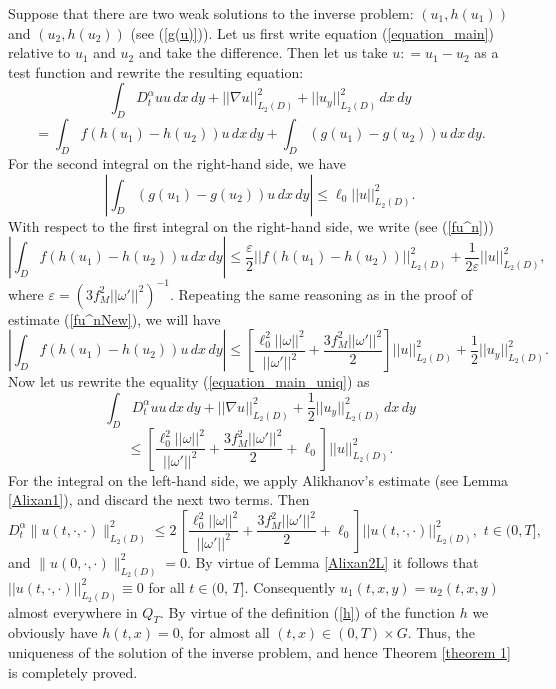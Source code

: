\documentclass[12pt]{amsart}
\theoremstyle{definition}
\numberwithin{equation}{section}
\begin{document}
Suppose that there are two weak solutions to the inverse problem: \( (u_1, h(u_1)) \) and \( (u_2, h(u_2)) \) (see (\ref{g(u)})).  
Let us first write equation (\ref{equation_main}) relative to $u_1$ and $u_2$ and take the difference. Then let us take $u: = u_1 - u_2$ as a test function and rewrite the resulting equation:
\begin{equation}\label{equation_main_uniq}
    \int_D D_t^\alpha u u \, dx \, dy + ||\nabla u||^2_{L_2(D)} + || u_y||^2_{L_2(D)} \, dx \, dy
    \end{equation}
    \[
    = \int_D f (h(u_1) -h(u_2)) u \, dx \, dy + \int_D ( g(u_1) - g(u_2)) u \, dx \, dy.
    \]
    For the second integral on the right-hand side, we have
\[
\left|\int_D ( g(u_1) - g(u_2)) u \, dx \, dy\right|\leq \ell_0 ||u||^2_{L_2(D)}.
\]
With respect to the first integral on the right-hand side, we write (see (\ref{fu^n}))
\[
\left|\int_D  f (h(u_1) -h(u_2)) u\, dx\, dy\right |\leq \frac{\varepsilon}{2} || f (h(u_1) -h(u_2))||_{L_2(D)}^2 + \frac{1}{2\varepsilon} ||u||_{L_2(D)}^2,
\]
where $\varepsilon = (3 f_M^2 ||\omega'||^2)^{-1}$. Repeating the same reasoning as in the proof of estimate (\ref{fu^nNew}), we will have
 \[\left|\int_D  f (h(u_1) -h(u_2)) u\, dx\, dy\right |\leq    \left[\frac{\ell_0^2 ||\omega||^2}{||\omega'||^2} + \frac{3 f_M^2 ||\omega'||^2}{2}\right] ||u||_{L_2(D)}^2 + \frac{1}{2} ||u_y||_{L_2(D)}^2.
    \]
    Now let us rewrite the equality (\ref{equation_main_uniq}) as
\[
 \int_D D_t^\alpha u u \, dx \, dy + ||\nabla u||^2_{L_2(D)} + \frac{1}{2} || u_y||^2_{L_2(D)} \, dx \, dy
\]
\[
\leq \left[\frac{\ell_0^2 ||\omega||^2}{||\omega'||^2} + \frac{3 f_M^2 ||\omega'||^2}{2} + \ell_0 \right] ||u||_{L_2(D)}^2.
\]
For the integral on the left-hand side, we apply Alikhanov's estimate (see Lemma \ref{Alixan1}), and discard the next two terms. Then
\[
D_t^\alpha \| u(t, \cdot, \cdot) \|_{L_2(D)}^2 \leq 2\,\left[\frac{\ell_0^2 ||\omega||^2}{||\omega'||^2} + \frac{3 f_M^2 ||\omega'||^2}{2} + \ell_0 \right] ||u (t, \cdot, \cdot)||_{L_2(D)}^2, \,\, t\in (0, T],
\]
and \(\| u (0, \cdot, \cdot)\|_{L_2(D)}^2 =0\). By virtue of Lemma \ref{Alixan2L} it follows that $||u (t, \cdot, \cdot)||_{L_2(D)}^2 \equiv 0$ for all $t\in (0,\, T]$. Consequently $u_1 (t, x, y) = u_2 (t, x, y)$ almost everywhere in $Q_T$. By virtue of the definition (\ref{h}) of the function $h$ we obviously have $h(t, x) =0$, for almost all $(t, x) \in (0, T)\times G$. Thus, the uniqueness of the solution of the inverse problem, and hence Theorem \ref{theorem 1} is completely proved.
\end{document}
